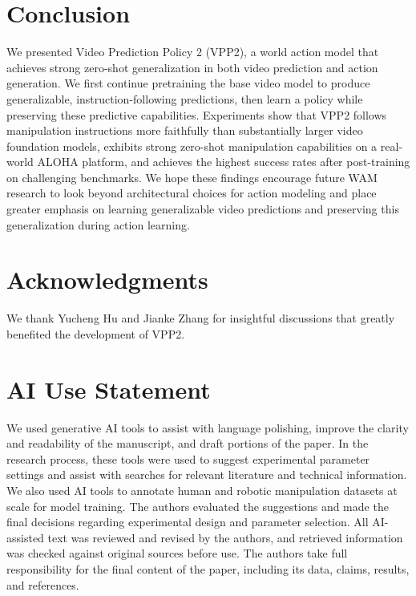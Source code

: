 \vspace{-1mm}
\section{Conclusion}
\vspace{-1mm}
We presented Video Prediction Policy 2 (VPP2), a world action model that achieves strong zero-shot generalization in both video prediction and action generation. We first continue pretraining the base video model to produce generalizable, instruction-following predictions, then learn a policy while preserving these predictive capabilities. Experiments show that VPP2 follows manipulation instructions more faithfully than substantially larger video foundation models, exhibits strong zero-shot manipulation capabilities on a real-world ALOHA platform, and achieves the highest success rates after post-training on challenging benchmarks. We hope these findings encourage future WAM research to look beyond architectural choices for action modeling and place greater emphasis on learning generalizable video predictions and preserving this generalization during action learning.

\newpage

\section*{Acknowledgments}
We thank Yucheng Hu and Jianke Zhang for insightful discussions that greatly benefited the development of VPP2.

\section*{AI Use Statement}
We used generative AI tools to assist with language polishing, improve the clarity and readability of the manuscript, and draft portions of the paper. In the research process, these tools were used to suggest experimental parameter settings and assist with searches for relevant literature and technical information. We also used AI tools to annotate human and robotic manipulation datasets at scale for model training. The authors evaluated the suggestions and made the final decisions regarding experimental design and parameter selection. All AI-assisted text was reviewed and revised by the authors, and retrieved information was checked against original sources before use. The authors take full responsibility for the final content of the paper, including its data, claims, results, and references.

